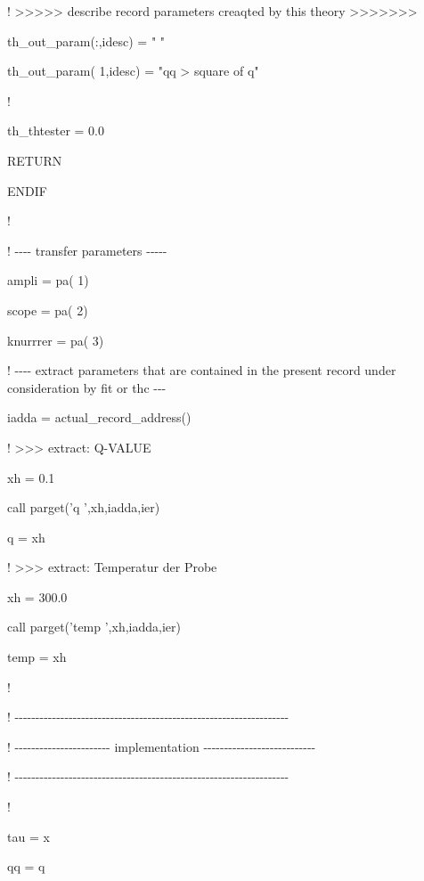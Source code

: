 \documentclass[]{article}
\begin{document}
! \textgreater{}\textgreater{}\textgreater{}\textgreater{}\textgreater{}
describe record parameters creaqted by this theory
\textgreater{}\textgreater{}\textgreater{}\textgreater{}\textgreater{}\textgreater{}\textgreater{}

th\_out\_param(:,idesc) = " "

th\_out\_param( 1,idesc) = "qq \textgreater{} square of q"

!

th\_thtester = 0.0

RETURN

ENDIF

!

! -\/-\/-\/- transfer parameters -\/-\/-\/-\/-

ampli = pa( 1)

scope = pa( 2)

knurrrer = pa( 3)

! -\/-\/-\/- extract parameters that are contained in the present record
under consideration by fit or thc -\/-\/-

iadda = actual\_record\_address()

! \textgreater{}\textgreater{}\textgreater{} extract: Q-VALUE

xh = 0.1

call parget('q ',xh,iadda,ier)

q = xh

! \textgreater{}\textgreater{}\textgreater{} extract: Temperatur der
Probe

xh = 300.0

call parget('temp ',xh,iadda,ier)

temp = xh

!

!
-\/-\/-\/-\/-\/-\/-\/-\/-\/-\/-\/-\/-\/-\/-\/-\/-\/-\/-\/-\/-\/-\/-\/-\/-\/-\/-\/-\/-\/-\/-\/-\/-\/-\/-\/-\/-\/-\/-\/-\/-\/-\/-\/-\/-\/-\/-\/-\/-\/-\/-\/-\/-\/-\/-\/-\/-\/-\/-\/-\/-\/-\/-\/-\/-\/-

! -\/-\/-\/-\/-\/-\/-\/-\/-\/-\/-\/-\/-\/-\/-\/-\/-\/-\/-\/-\/-\/-\/-
implementation
-\/-\/-\/-\/-\/-\/-\/-\/-\/-\/-\/-\/-\/-\/-\/-\/-\/-\/-\/-\/-\/-\/-\/-\/-\/-\/-

!
-\/-\/-\/-\/-\/-\/-\/-\/-\/-\/-\/-\/-\/-\/-\/-\/-\/-\/-\/-\/-\/-\/-\/-\/-\/-\/-\/-\/-\/-\/-\/-\/-\/-\/-\/-\/-\/-\/-\/-\/-\/-\/-\/-\/-\/-\/-\/-\/-\/-\/-\/-\/-\/-\/-\/-\/-\/-\/-\/-\/-\/-\/-\/-\/-\/-

!

tau = x

qq = q
\end{document}
